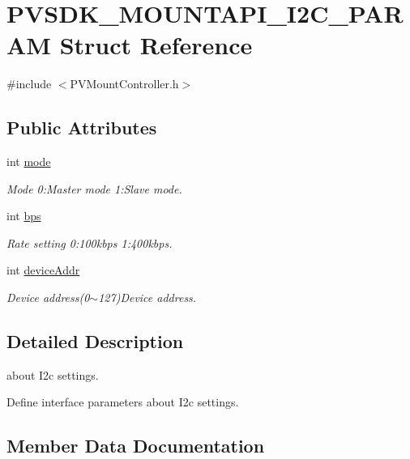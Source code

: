 \hypertarget{struct_p_v_s_d_k___m_o_u_n_t_a_p_i___i2_c___p_a_r_a_m}{}\section{P\+V\+S\+D\+K\+\_\+\+M\+O\+U\+N\+T\+A\+P\+I\+\_\+\+I2\+C\+\_\+\+P\+A\+R\+AM Struct Reference}
\label{struct_p_v_s_d_k___m_o_u_n_t_a_p_i___i2_c___p_a_r_a_m}


{\ttfamily \#include $<$P\+V\+Mount\+Controller.\+h$>$}

\subsection*{Public Attributes}
\begin{DoxyCompactItemize}
\item 
int \hyperlink{struct_p_v_s_d_k___m_o_u_n_t_a_p_i___i2_c___p_a_r_a_m_abb11b0ffb7b2c3b3af41bb721652da4e}{mode}
\begin{DoxyCompactList}\small\item\em Mode 0\+:Master mode 1\+:Slave mode. \end{DoxyCompactList}\item 
int \hyperlink{struct_p_v_s_d_k___m_o_u_n_t_a_p_i___i2_c___p_a_r_a_m_a4829373f8818886ad86e6cce09282a7b}{bps}
\begin{DoxyCompactList}\small\item\em Rate setting 0\+:100kbps 1\+:400kbps. \end{DoxyCompactList}\item 
int \hyperlink{struct_p_v_s_d_k___m_o_u_n_t_a_p_i___i2_c___p_a_r_a_m_a1c46d0e41cd2787b65ae4cdd0d90652f}{device\+Addr}
\begin{DoxyCompactList}\small\item\em Device address(0$\sim$127)Device address. \end{DoxyCompactList}\end{DoxyCompactItemize}


\subsection{Detailed Description}
about I2c settings.

Define interface parameters about I2c settings. 

\subsection{Member Data Documentation}
\mbox{\label{struct_p_v_s_d_k___m_o_u_n_t_a_p_i___i2_c___p_a_r_a_m_a4829373f8818886ad86e6cce09282a7b}} 
